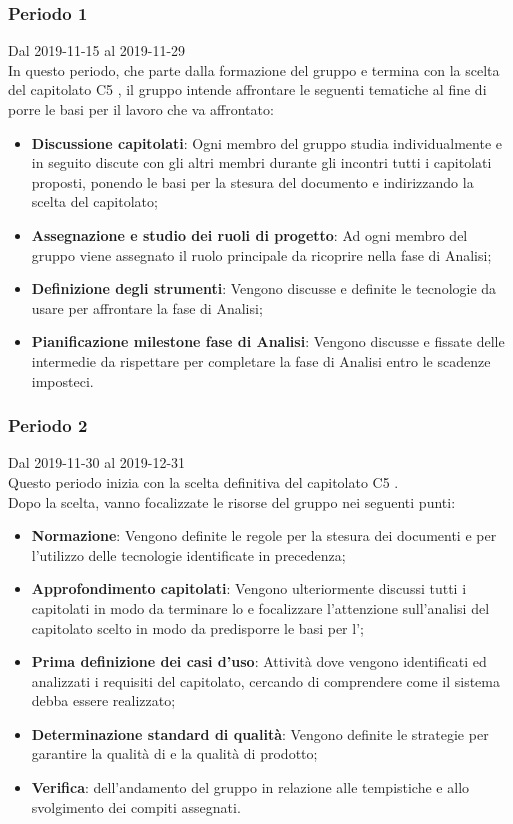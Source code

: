 \subsubsection{Periodo 1}
Dal 2019-11-15 al 2019-11-29\\
In questo periodo, che parte dalla formazione del gruppo e termina con la scelta del capitolato C5 \NomeProgetto{}, il gruppo intende affrontare le seguenti tematiche al fine di porre le basi per il lavoro che va affrontato:
\begin{itemize}
	\item \textbf{Discussione capitolati}: Ogni membro del gruppo studia individualmente e in seguito discute con gli altri membri durante gli incontri tutti i capitolati proposti, ponendo le basi per la stesura del documento \SdF{} e indirizzando la scelta del capitolato;
	\item \textbf{Assegnazione e studio dei ruoli di progetto}: Ad ogni membro del gruppo viene assegnato il ruolo principale da ricoprire nella fase di Analisi;
	\item \textbf{Definizione degli strumenti}: Vengono discusse e definite le tecnologie da usare per affrontare la fase di Analisi;
	\item \textbf{Pianificazione milestone fase di Analisi}: Vengono discusse e fissate delle  intermedie da rispettare per completare la fase di Analisi entro le scadenze imposteci.
\end{itemize}

\subsubsection{Periodo 2} 
Dal 2019-11-30 al 2019-12-31\\
Questo periodo inizia con la scelta definitiva del capitolato C5 \NomeProgetto{}.\\
Dopo la scelta, vanno focalizzate le risorse del gruppo nei seguenti punti:
\begin{itemize}
	\item \textbf{Normazione}: Vengono definite le regole per la stesura dei documenti e per l'utilizzo delle tecnologie identificate in precedenza;
	\item \textbf{Approfondimento capitolati}: Vengono ulteriormente discussi tutti i capitolati in modo da terminare lo \SdF{} e focalizzare l'attenzione sull'analisi del capitolato scelto in modo da predisporre le basi per l'\AdR{};
	\item \textbf{Prima definizione dei casi d'uso}: Attività dove vengono identificati ed analizzati i requisiti del capitolato, cercando di comprendere come il sistema debba essere realizzato;
	\item \textbf{Determinazione standard di qualità}: Vengono definite le strategie per garantire la qualità di  e la qualità di prodotto;
	\item \textbf{Verifica}:  dell'andamento del gruppo in relazione alle tempistiche e allo svolgimento dei compiti assegnati.
\end{itemize}


